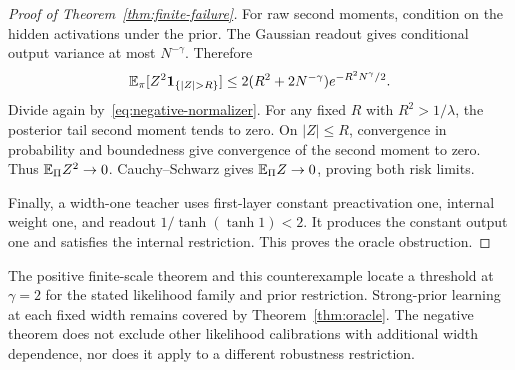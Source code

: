 \begin{proof}[Proof of Theorem~\ref{thm:finite-failure}]
For raw second moments, condition on the hidden activations under the prior. The Gaussian readout gives conditional output variance at most $N^{-\gamma}$. Therefore
\[
 \E_\pi[Z^2\mathbf1_{\{|Z|>R\}}]
 \leq2(R^2+2N^{-\gamma})e^{-R^2N^\gamma/2}.
\]
Divide again by~\eqref{eq:negative-normalizer}. For any fixed $R$ with $R^2>1/\lambda$, the posterior tail second moment tends to zero. On $|Z|\leq R$, convergence in probability and boundedness give convergence of the second moment to zero. Thus $\mathbb E_\Pi Z^2\to0$. Cauchy--Schwarz gives $\mathbb E_\Pi Z\to0$, proving both risk limits.

Finally, a width-one teacher uses first-layer constant preactivation one, internal weight one, and readout $1/\tanh(\tanh1)<2$. It produces the constant output one and satisfies the internal restriction. This proves the oracle obstruction.
\end{proof}

The positive finite-scale theorem and this counterexample locate a threshold at $\gamma=2$ for the stated likelihood family and prior restriction. Strong-prior learning at each fixed width remains covered by Theorem~\ref{thm:oracle}. The negative theorem does not exclude other likelihood calibrations with additional width dependence, nor does it apply to a different robustness restriction.
